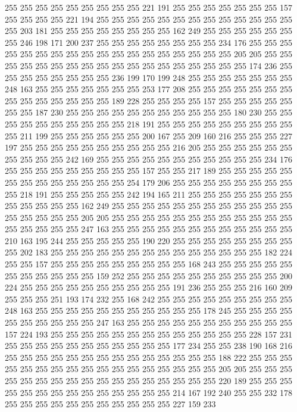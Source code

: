 255 255 255 255 255 255 255 255 255 221 191 255 255 255 255 255 255 255 157 255
255 255 255 221 194 255 255 255 255 255 255 255 255 255 255 255 255 255 255 203
181 255 255 255 255 255 255 255 255 162 249 255 255 255 255 255 255 255 246 198
171 200 237 255 255 255 255 255 255 255 255 234 176 255 255 255 255 255 255 255
255 255 255 255 255 255 255 255 255 255 255 205 205 255 255 255 255 255 255 255
255 255 255 255 255 255 255 255 255 255 255 174 236 255 255 255 255 255 255 255
255 236 199 170 199 248 255 255 255 255 255 255 255 248 163 255 255 255 255 255
255 255 253 177 208 255 255 255 255 255 255 255 255 255 255 255 255 255 255 189
228 255 255 255 255 157 255 255 255 255 255 255 255 187 230 255 255 255 255 255
255 255 255 255 255 255 180 230 255 255 255 255 255 255 255 255 255 255 218 191
255 255 255 255 255 255 255 255 255 255 211 199 255 255 255 255 255 255 200 167
255 209 160 216 255 255 255 227 197 255 255 255 255 255 255 255 255 255 255 216
205 255 255 255 255 255 255 255 255 255 255 242 169 255 255 255 255 255 255 255
255 255 255 255 234 176 255 255 255 255 255 255 255 255 255 157 255 255 217 189
255 255 255 255 255 255 255 255 255 255 255 255 255 254 179 206 255 255 255 255
255 255 255 255 255 218 191 255 255 255 255 255 242 194 165 211 255 255 255 255
255 255 255 255 255 255 255 255 162 249 255 255 255 255 255 255 255 255 255 255
255 255 255 255 255 255 255 205 205 255 255 255 255 255 255 255 255 255 255 255
255 255 255 255 255 255 247 163 255 255 255 255 255 255 255 255 255 255 255 255
210 163 195 244 255 255 255 255 255 190 220 255 255 255 255 255 255 255 255 255
202 183 255 255 255 255 255 255 255 255 255 255 255 255 255 255 182 224 255 255
157 255 255 255 255 255 255 255 255 255 168 243 255 255 255 255 255 255 255 255
255 255 255 159 252 255 255 255 255 255 255 255 255 255 255 200 224 255 255 255
255 255 255 255 255 255 255 191 236 255 255 255 216 160 209 255 255 255 251 193
174 232 255 168 242 255 255 255 255 255 255 255 255 255 248 163 255 255 255 255
255 255 255 255 255 255 255 178 245 255 255 255 255 255 255 255 255 255 255 247
163 255 255 255 255 255 255 255 255 255 255 255 157 224 193 255 255 255 255 255
255 255 255 255 255 255 255 255 228 157 231 255 255 255 255 255 255 255 255 255
255 255 177 234 255 255 238 190 168 216 255 255 255 255 255 255 255 255 255 255
255 255 255 255 188 222 255 255 255 255 255 255 255 255 255 255 255 255 255 255
255 255 255 205 205 255 255 255 255 255 255 255 255 255 255 255 255 255 255 255
255 255 220 189 255 255 255 255 255 255 255 255 255 255 255 255 255 255 214 167
192 240 255 255 232 178 255 255 255 255 255 255 255 255 255 255 255 227 159 233
